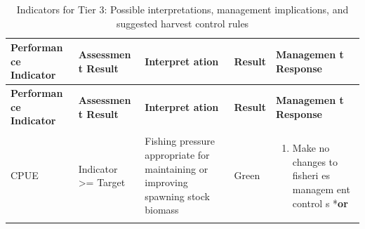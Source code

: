\documentclass[]{book}
\providecommand{\tightlist}{%
  \setlength{\itemsep}{0pt}\setlength{\parskip}{0pt}}
\begin{document}
\begin{longtable}[]{@{}lllll@{}}
\caption{\label{tab:hcrs-3} Indicators for Tier 3: Possible interpretations,
management implications, and suggested harvest control
rules}\tabularnewline
\toprule
\begin{minipage}[b]{0.17\columnwidth}\raggedright\strut
\textbf{Performan ce Indicator}\strut
\end{minipage} & \begin{minipage}[b]{0.17\columnwidth}\raggedright\strut
\textbf{Assessmen t Result}\strut
\end{minipage} & \begin{minipage}[b]{0.17\columnwidth}\raggedright\strut
\textbf{Interpret ation}\strut
\end{minipage} & \begin{minipage}[b]{0.17\columnwidth}\raggedright\strut
\textbf{Result}\strut
\end{minipage} & \begin{minipage}[b]{0.17\columnwidth}\raggedright\strut
\textbf{Managemen t Response}\strut
\end{minipage}\tabularnewline
\midrule
\endfirsthead
\toprule
\begin{minipage}[b]{0.17\columnwidth}\raggedright\strut
\textbf{Performan ce Indicator}\strut
\end{minipage} & \begin{minipage}[b]{0.17\columnwidth}\raggedright\strut
\textbf{Assessmen t Result}\strut
\end{minipage} & \begin{minipage}[b]{0.17\columnwidth}\raggedright\strut
\textbf{Interpret ation}\strut
\end{minipage} & \begin{minipage}[b]{0.17\columnwidth}\raggedright\strut
\textbf{Result}\strut
\end{minipage} & \begin{minipage}[b]{0.17\columnwidth}\raggedright\strut
\textbf{Managemen t Response}\strut
\end{minipage}\tabularnewline
\midrule
\endhead
\begin{minipage}[t]{0.19\columnwidth}\raggedright\strut
CPUE\strut
\end{minipage} & \begin{minipage}[t]{0.19\columnwidth}\raggedright\strut
Indicator \textgreater{}= Target\strut
\end{minipage} & \begin{minipage}[t]{0.19\columnwidth}\raggedright\strut
Fishing pressure appropriate for maintaining or improving spawning stock
biomass\strut
\end{minipage} & \begin{minipage}[t]{0.19\columnwidth}\raggedright\strut
Green\strut
\end{minipage} & \begin{minipage}[t]{0.19\columnwidth}\raggedright\strut
\begin{enumerate}
\def\labelenumi{\arabic{enumi}.}
\tightlist
\item
  Make no changes to fisheri es managem ent control s *\textbf{or}
\end{enumerate}


\end{minipage}
\end{longtable}
\end{document}
